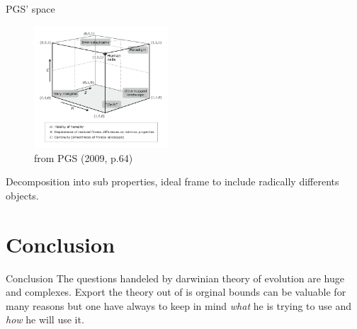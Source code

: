 \documentclass[8pt]{beamer}
\begin{document}
\begin{frame}{PGS' space}
	
	\begin{figure}[h]
		\begin{center}
			\includegraphics[width=5cm]{./images/PGS.png}
		\end{center}
		\caption{from PGS (2009, p.64)}
		\label{fig:PGS}
	\end{figure}
	
	Decomposition into sub properties, ideal frame to include radically differents objects.
\end{frame}

\section{Conclusion}
	
\begin{frame}{Conclusion}
	The questions handeled by darwinian theory of evolution are huge and complexes. 
	Export the theory out of is orginal bounds can be valuable for many reasons but one have always to keep in mind \emph{what} he is trying to use and \emph{how} he will use it.
		
\end{frame}
\end{document}
